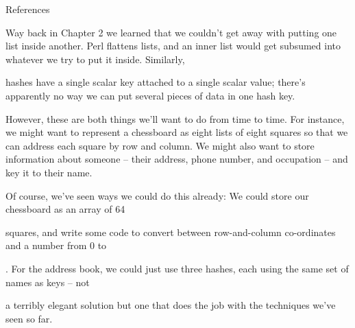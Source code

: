 \documentclass[a4paper,11pt]{book}
\begin{document}

\noindent 

\noindent 

\noindent 

\noindent 

\noindent 

\noindent 

\noindent 

\noindent 

\noindent 

\noindent 

\noindent 

\noindent 

\noindent 

\noindent 

\noindent 

\noindent References

\noindent 

\noindent 

\noindent 

\noindent 

\noindent Way back in Chapter 2 we learned that we couldn't get away with putting one list inside another. Perl flattens lists, and an inner list would get subsumed into whatever we try to put it inside. Similarly,

\noindent hashes have a single scalar key attached to a single scalar value; there's apparently no way we can put several pieces of data in one hash key.

\noindent 

\noindent However, these are both things we'll want to do from time to time. For instance, we might want to represent a chessboard as eight lists of eight squares so that we can address each square by row and column. We might also want to store information about someone -- their address, phone number, and occupation -- and key it to their name.

\noindent 

\noindent Of course, we've seen ways we could do this already: We could store our chessboard as an array of 64

\noindent squares, and write some code to convert between row-and-column co-ordinates and a number from 0 to

. For the address book, we could just use three hashes, each using the same set of names as keys -- not

\noindent a terribly elegant solution but one that does the job with the techniques we've seen so far.
\end{document}
